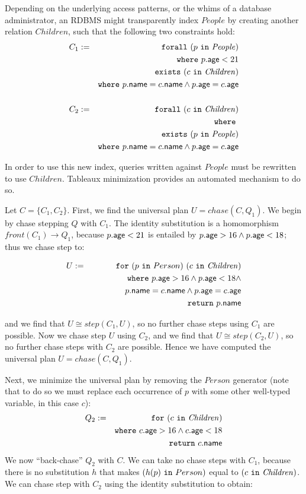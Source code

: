 \documentclass[preprint]{sigplanconf}
\newcommand{\FOR}{{\tt for}\relax\ifmmode\ \else\xspace\fi}
\newcommand{\FORALL}{{\tt forall}\relax\ifmmode\ \else\xspace\fi}
\newcommand{\EXISTS}{{\tt exists}\relax\ifmmode\ \else\xspace\fi}
\newcommand{\WHERE}{{\tt where}\relax\ifmmode\ \else\xspace\fi}
\newcommand{\IN}{ \ {\tt in} \ }
\newcommand{\RETURN}{{\tt return}\relax\ifmmode\ \else\xspace\fi}
\newcommand{\relation}[1]{\ensuremath{\mathit{#1}}\xspace}
\begin{document}
Depending on the underlying access patterns, or the whims of a database administrator, an RDBMS might transparently index \relation{People} by creating another relation \relation{Children}, such that the following two constraints hold:
\begin{eqnarray*}
C_1 & := & \FORALL (p \IN \relation{People}) \\
 & & \WHERE p.{\sf age} < 21 \\
 & & \EXISTS (c \IN \relation{Children}) \\
 & & \WHERE p.{\sf name} = c.{\sf name} \wedge p.{\sf age} = c.{\sf age}  \\
 & & \\
  C_2 & := & \FORALL (c \IN \relation{Children}) \\
  & & \WHERE \\
 & & \EXISTS (p \IN \relation{People}) \\
 & & \WHERE p.{\sf name} = c.{\sf name} \wedge p.{\sf age} = c.{\sf age}
\end{eqnarray*}

In order to use this new index, queries written against \relation{People} must be rewritten to use \relation{Children}.
Tableaux minimization provides an automated mechanism to do so.

Let $C = \{ C_1, C_2\}$.  First, we find the universal plan $U = chase(C, Q_1)$.  We begin by chase stepping $Q$ with $C_1$.  The identity substitution is a homomorphism $front(C_1) \to Q_1$, because $p.{\sf age} < 21$ is entailed by $p.{\sf age} > 16 \wedge p.{\sf age} < 18$; thus we chase step to:
\begin{normalsize}
\begin{eqnarray*}
U & := & \FOR (p \IN Person) \ (c \IN \relation{Children}) \\
 & & \WHERE p.{\sf age} > 16 \wedge p.{\sf age} < 18 \wedge \\
 & & \ \ \ \ \ \ \ \ \ \ \ \ p.{\sf name} = c.{\sf name} \wedge p.{\sf age} = c.{\sf age} \\
 & & \RETURN p.{\sf name}
\end{eqnarray*}  
\end{normalsize}
and we find that $U \cong step(C_1, U)$, so no further chase steps using $C_1$ are possible.  Now we chase step $U$ using $C_2$, and we find that $U \cong step(C_2, U)$, so no further chase steps with $C_2$ are possible.  Hence we have computed the universal plan $U = chase(C,Q_1)$.

Next, we minimize the universal plan by removing the \relation{Person} generator (note that to do so we must replace each occurrence of $p$ with some other well-typed variable, in this case $c$):
\begin{eqnarray*}
Q_2 & := & \FOR (c \IN \relation{Children}) \\
 & & \WHERE c.{\sf age} > 16 \wedge c.{\sf age} < 18 \\
  & & \RETURN c.{\sf name}
\end{eqnarray*}  
We now ``back-chase'' $Q_2$ with $C$.  We can take no chase steps with $C_1$, because there is no substitution $h$ that makes $(h(p) \IN Person)$ equal to $(c \IN \relation{Children})$.  We can chase step with $C_2$ using the identity substitution to obtain:
\end{document}
